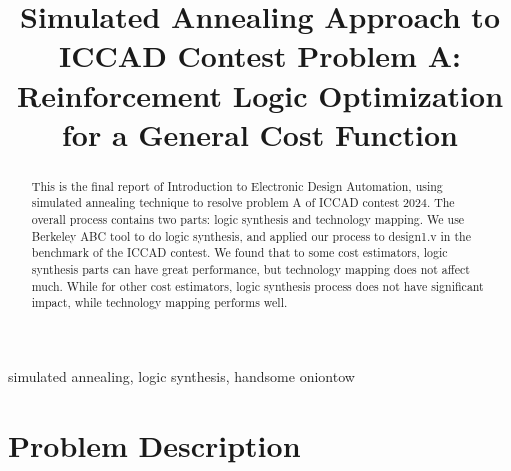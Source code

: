 \documentclass[conference]{IEEEtran}
\begin{document}
\title{Simulated Annealing Approach to ICCAD Contest Problem A: Reinforcement Logic Optimization for a General Cost Function\\}


\author{
\and
{}
\and
{}
}

\maketitle

\begin{abstract}
This is the final report of Introduction to Electronic Design Automation, using simulated annealing technique to resolve problem A of ICCAD contest 2024.
The overall process contains two parts: logic synthesis and technology mapping. We use Berkeley ABC tool to do logic synthesis, and applied our process to design1.v in the benchmark of the ICCAD contest. We found that to some cost estimators, logic synthesis parts can have great performance, but technology mapping does not affect much. While for other cost estimators, logic synthesis process does not have significant impact, while technology mapping performs well.
\end{abstract}

\begin{IEEEkeywords}
simulated annealing, logic synthesis, handsome oniontow
\end{IEEEkeywords}

\section{Problem Description}
\end{document}
